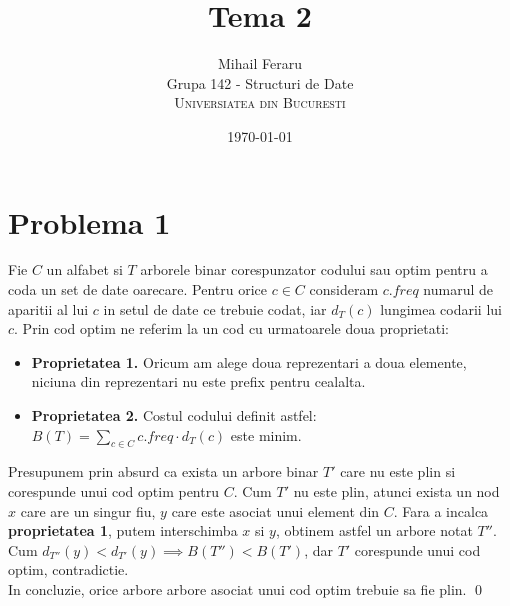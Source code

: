 \documentclass[12pt]{article}
\title{Tema 2}
\author{Mihail Feraru\\
Grupa 142 - Structuri de Date\\
\textsc{Universiatea din Bucuresti}
}
\date{\today} %
\begin{document}
\setlength{\droptitle}{-5em}    
\maketitle


\section*{Problema 1}

Fie $C$ un alfabet si $T$ arborele binar corespunzator codului sau optim pentru a coda un set de date oarecare. Pentru orice $c \in C$ consideram $c.freq$ numarul de aparitii al lui $c$ in setul de date ce trebuie codat, iar $d_T(c)$ lungimea codarii lui $c$. Prin cod optim ne referim la un cod cu urmatoarele doua proprietati:
\begin{itemize}
    \item[] \textbf{Proprietatea 1.} Oricum am alege doua reprezentari a doua elemente, niciuna din reprezentari nu este prefix pentru cealalta.
    \item[] \textbf{Proprietatea 2.} Costul codului definit astfel: $B(T) = \sum\limits_{c \in C} {c.freq \cdot d_T(c)}$ este minim.
\end{itemize}

Presupunem prin absurd ca exista un arbore binar $T'$ care nu este plin si corespunde unui cod optim pentru $C$. Cum $T'$ nu este plin, atunci exista un nod $x$ care are un singur fiu, $y$ care este asociat unui element din $C$. Fara a incalca \textbf{proprietatea 1}, putem interschimba $x$ si $y$, obtinem astfel un arbore notat $T''$. Cum $d_{T''}(y) < d_{T'}(y) \implies B(T'') < B(T')$, dar $T'$ corespunde unui cod optim, contradictie. \\

In concluzie, orice arbore arbore asociat unui cod optim trebuie sa fie plin. \qed
\end{document}
